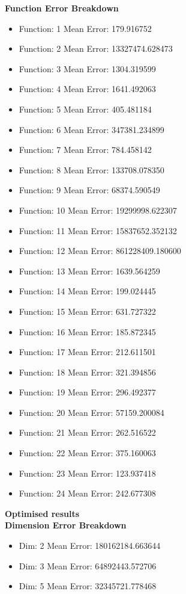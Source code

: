 \documentclass[12pt]{article}
\begin{document}
\textbf{Function Error Breakdown}
\begin{itemize}
	\item Function:  1  Mean Error: 179.916752
	\item Function:  2  Mean Error: 13327474.628473
	\item Function:  3  Mean Error: 1304.319599
	\item Function:  4  Mean Error: 1641.492063
	\item Function:  5  Mean Error: 405.481184
	\item Function:  6  Mean Error: 347381.234899
	\item Function:  7  Mean Error: 784.458142
	\item Function:  8  Mean Error: 133708.078350
	\item Function:  9  Mean Error: 68374.590549
	\item Function: 10  Mean Error: 19299998.622307
	\item Function: 11  Mean Error: 15837652.352132
	\item Function: 12  Mean Error: 861228409.180600
	\item Function: 13  Mean Error: 1639.564259
	\item Function: 14  Mean Error: 199.024445
	\item Function: 15  Mean Error: 631.727322
	\item Function: 16  Mean Error: 185.872345
	\item Function: 17  Mean Error: 212.611501
	\item Function: 18  Mean Error: 321.394856
	\item Function: 19  Mean Error: 296.492377
	\item Function: 20  Mean Error: 57159.200084
	\item Function: 21  Mean Error: 262.516522
	\item Function: 22  Mean Error: 375.160063
	\item Function: 23  Mean Error: 123.937418	
	\item Function: 24  Mean Error: 242.677308
\end{itemize}

\quad\textbf{Optimised results}\\

\textbf{Dimension Error Breakdown}
\begin{itemize}
	\item Dim: 2  Mean Error: 180162184.663644	
	\item Dim: 3  Mean Error: 64892443.572706
	\item Dim: 5  Mean Error: 32345721.778468
\end{itemize}
\end{document}
